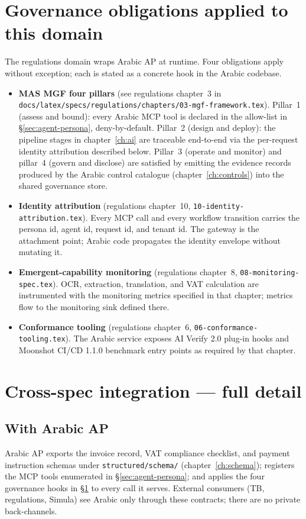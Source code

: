 \documentclass[11pt,a4paper,twoside]{report}
\begin{document}
\section{Governance obligations applied to this domain}
\label{sec:agent-governance}
The regulations domain wraps Arabic AP at runtime. Four obligations
apply without exception; each is stated as a concrete hook in the
Arabic codebase.

\begin{itemize}
  \item \textbf{MAS MGF four pillars} (see regulations
    chapter~3 in \texttt{docs/latex/specs/regulations/chapters/03-mgf-framework.tex}).
    Pillar~1 (assess and bound): every Arabic MCP tool is declared in
    the allow-list in \S\ref{sec:agent-persona}, deny-by-default.
    Pillar~2 (design and deploy): the pipeline stages in
    chapter~\ref{ch:ai} are traceable end-to-end via the
    per-request identity attribution described below. Pillar~3
    (operate and monitor) and pillar~4 (govern and disclose) are
    satisfied by emitting the evidence records produced by the
    Arabic control catalogue (chapter~\ref{ch:controls}) into the
    shared governance store.
  \item \textbf{Identity attribution} (regulations chapter~10,
    \texttt{10-identity-attribution.tex}). Every MCP call and every
    workflow transition carries the persona id, agent id, request
    id, and tenant id. The gateway is the attachment point; Arabic
    code propagates the identity envelope without mutating it.
  \item \textbf{Emergent-capability monitoring} (regulations
    chapter~8, \texttt{08-monitoring-spec.tex}). OCR, extraction,
    translation, and VAT calculation are instrumented with the
    monitoring metrics specified in that chapter; metrics flow to
    the monitoring sink defined there.
  \item \textbf{Conformance tooling} (regulations chapter~6,
    \texttt{06-conformance-tooling.tex}). The Arabic service exposes
    AI Verify 2.0 plug-in hooks and Moonshot CI/CD 1.1.0 benchmark
    entry points as required by that chapter.
\end{itemize}

\section{Cross-spec integration --- full detail}
\label{sec:agent-integration}

\subsection{With Arabic AP}
Arabic AP exports the invoice record, VAT compliance checklist, and
payment instruction schemas under \texttt{structured/schema/}
(chapter~\ref{ch:schema}); registers the MCP tools enumerated in
\S\ref{sec:agent-persona}; and applies the four governance hooks in
\S\ref{sec:agent-governance} to every call it serves. External
consumers (TB, regulations, Simula) see Arabic only through these
contracts; there are no private back-channels.
\end{document}

